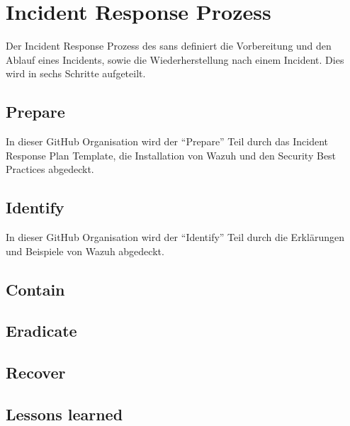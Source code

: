 \section{Incident Response Prozess}
Der Incident Response Prozess des \acrfull{sans} definiert die Vorbereitung und den Ablauf eines Incidents, sowie die Wiederherstellung nach einem Incident.
Dies wird in sechs Schritte aufgeteilt. 

\subsection{Prepare}


In dieser GitHub Organisation wird der ``Prepare'' Teil durch das Incident Response Plan Template, die Installation von Wazuh und den Security Best Practices abgedeckt.

\subsection{Identify}

In dieser GitHub Organisation wird der ``Identify'' Teil durch die Erklärungen und Beispiele von Wazuh abgedeckt.

\subsection{Contain}



\subsection{Eradicate}


\subsection{Recover}


\subsection{Lessons learned}



